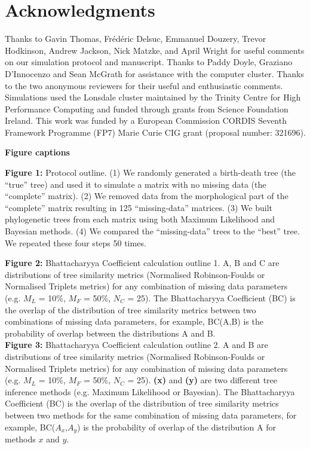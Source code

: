 \documentclass[12pt,letterpaper]{article}
\begin{document}
\section{Acknowledgments}
Thanks to Gavin Thomas, Fr\'{e}d\'{e}ric Delsuc, Emmanuel Douzery, Trevor Hodkinson, Andrew Jackson, Nick Matzke, and April Wright for useful comments on our simulation protocol and manuscript. Thanks to Paddy Doyle, Graziano D'Innocenzo and Sean McGrath for assistance with the computer cluster. Thanks to the two anonymous reviewers for their useful and enthusiastic %
comments. Simulations used the Lonsdale cluster maintained by the Trinity Centre for High Performance Computing and funded through grants from Science Foundation Ireland. This work was funded by a European Commission CORDIS Seventh Framework Programme (FP7) Marie Curie CIG grant (proposal number: 321696).

\nolinenumbers




\newpage
\noindent
\textbf{Figure captions}\\
\bigskip

\noindent
\textbf{Figure 1:} Protocol outline.
(1) We randomly generated a birth-death tree (the ``true'' tree) and used it to simulate a matrix with no missing data (the ``complete'' matrix).
(2) We removed data from the morphological part of the ``complete'' matrix resulting in 125 ``missing-data'' matrices.
(3) We built phylogenetic trees from each matrix using both Maximum Likelihood and Bayesian methods.
(4) We compared the ``missing-data'' trees to the ``best'' tree.
We repeated these four steps 50 times.\\
\bigskip

\noindent
\textbf{Figure 2:} Bhattacharyya Coefficient calculation outline 1. A, B and C are distributions of tree similarity metrics (Normalised Robinson-Foulds or Normalised Triplets metrics) for any combination of missing data parameters (e.g. $M_{L}$ = 10\%, $M_{F}$ = 50\%, $N_{C}$ = 25). The Bhattacharyya Coefficient (BC) is the overlap of the distribution of tree similarity metrics between two combinations of missing data parameters, for example, BC(A,B) is the probability of overlap between the distributions A and B.\\

\noindent
\textbf{Figure 3:} Bhattacharyya Coefficient calculation outline 2. A and B are distributions of tree similarity metrics (Normalised Robinson-Foulds or Normalised Triplets metrics) for any combination of missing data parameters (e.g. $M_{L}$ = 10\%, $M_{F}$ = 50\%, $N_{C}$ = 25). \textbf{(x)} and \textbf{(y)} are two different tree inference methods (e.g. Maximum Likelihood or Bayesian). The Bhattacharyya Coefficient (BC) is the overlap of the distribution of tree similarity metrics between two methods for the same combination of missing data parameters, for example, BC($A_{x}$,$A_{y}$) is the probability of overlap of the distribution A for methods $x$ and $y$.\\
\end{document}
